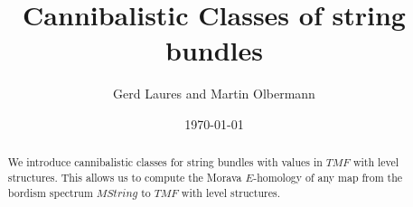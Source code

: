\documentclass{amsart}
\numberwithin{equation}{section}
\theoremstyle{definition}  %
\newtheorem{set theory}[thm]{Set Theoretic Prelude}
\begin{document}
\title{Cannibalistic Classes of string bundles}
\author{Gerd Laures and Martin Olbermann}

\address{ Fakult\"at f\"ur Mathematik,  Ruhr-Universit\"at Bochum, NA1/66, D-44780 Bochum, Germany}



\date{\today}

\begin{abstract}
We introduce cannibalistic classes for string bundles with values in $TMF$ with level structures. This allows us to compute the Morava $E$-homology of any map from the bordism spectrum $MString$ to $TMF$ with level structures.  

\end{abstract}

\maketitle
\end{document}
